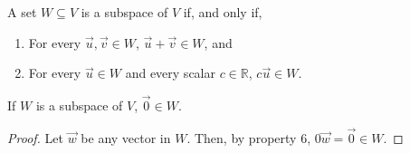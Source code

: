 \begin{theorem}
	A set $W \subseteq V$ is a subspace of $V$ if, and only if,
	\begin{enumerate}
		\item For every $\vec{u}, \vec{v} \in W$, $\vec{u} + \vec{v} \in W$, and
		\item For every $\vec{u} \in W$ and every scalar $c \in \mathbb{R}$, $c\vec{u} \in W$.
	\end{enumerate}
\end{theorem}

\begin{corollary}
	If $W$ is a subspace of $V$, $\vec{0} \in W$.
\end{corollary}

\begin{proof}
	Let $\vec{w}$ be any vector in $W$. Then, by property 6, $0\vec{w} = \vec{0} \in W$.
\end{proof}